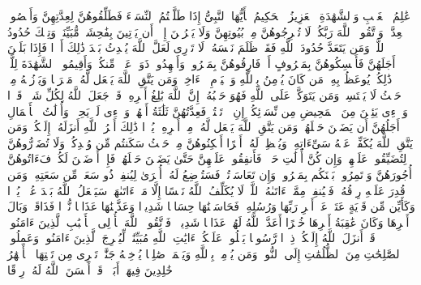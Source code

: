 \stopbuffer%
\startbuffer[\q:64:18]
عَٰلِمُ ٱلۡغَیۡبِ وَٱلشَّهَٰدَةِ ٱلۡعَزِیزُ ٱلۡحَكِیمُ%
\stopbuffer%
\startbuffer[\q:65:1]
یَٰۤأَیُّهَا ٱلنَّبِیُّ إِذَا طَلَّقۡتُمُ ٱلنِّسَاۤءَ فَطَلِّقُوهُنَّ لِعِدَّتِهِنَّ وَأَحۡصُوا۟ ٱلۡعِدَّةَۖ وَٱتَّقُوا۟ ٱللَّهَ رَبَّكُمۡۖ لَا تُخۡرِجُوهُنَّ مِنۢ بُیُوتِهِنَّ وَلَا یَخۡرُجۡنَ إِلَّاۤ أَن یَأۡتِینَ بِفَٰحِشَةࣲ مُّبَیِّنَةࣲۚ وَتِلۡكَ حُدُودُ ٱللَّهِۚ وَمَن یَتَعَدَّ حُدُودَ ٱللَّهِ فَقَدۡ ظَلَمَ نَفۡسَهُۥۚ لَا تَدۡرِی لَعَلَّ ٱللَّهَ یُحۡدِثُ بَعۡدَ ذَٰلِكَ أَمۡرࣰا%
\stopbuffer%
\startbuffer[\q:65:2]
فَإِذَا بَلَغۡنَ أَجَلَهُنَّ فَأَمۡسِكُوهُنَّ بِمَعۡرُوفٍ أَوۡ فَارِقُوهُنَّ بِمَعۡرُوفࣲ وَأَشۡهِدُوا۟ ذَوَیۡ عَدۡلࣲ مِّنكُمۡ وَأَقِیمُوا۟ ٱلشَّهَٰدَةَ لِلَّهِۚ ذَٰلِكُمۡ یُوعَظُ بِهِۦ مَن كَانَ یُؤۡمِنُ بِٱللَّهِ وَٱلۡیَوۡمِ ٱلۡءَاخِرِۚ وَمَن یَتَّقِ ٱللَّهَ یَجۡعَل لَّهُۥ مَخۡرَجࣰا%
\stopbuffer%
\startbuffer[\q:65:3]
وَیَرۡزُقۡهُ مِنۡ حَیۡثُ لَا یَحۡتَسِبُۚ وَمَن یَتَوَكَّلۡ عَلَى ٱللَّهِ فَهُوَ حَسۡبُهُۥۤۚ إِنَّ ٱللَّهَ بَٰلِغُ أَمۡرِهِۦۚ قَدۡ جَعَلَ ٱللَّهُ لِكُلِّ شَیۡءࣲ قَدۡرࣰا%
\stopbuffer%
\startbuffer[\q:65:4]
وَٱلَّٰۤءِی یَئِسۡنَ مِنَ ٱلۡمَحِیضِ مِن نِّسَاۤئِكُمۡ إِنِ ٱرۡتَبۡتُمۡ فَعِدَّتُهُنَّ ثَلَٰثَةُ أَشۡهُرࣲ وَٱلَّٰۤءِی لَمۡ یَحِضۡنَۚ وَأُو۟لَٰتُ ٱلۡأَحۡمَالِ أَجَلُهُنَّ أَن یَضَعۡنَ حَمۡلَهُنَّۚ وَمَن یَتَّقِ ٱللَّهَ یَجۡعَل لَّهُۥ مِنۡ أَمۡرِهِۦ یُسۡرࣰا%
\stopbuffer%
\startbuffer[\q:65:5]
ذَٰلِكَ أَمۡرُ ٱللَّهِ أَنزَلَهُۥۤ إِلَیۡكُمۡۚ وَمَن یَتَّقِ ٱللَّهَ یُكَفِّرۡ عَنۡهُ سَیِّءَاتِهِۦ وَیُعۡظِمۡ لَهُۥۤ أَجۡرًا%
\stopbuffer%
\startbuffer[\q:65:6]
أَسۡكِنُوهُنَّ مِنۡ حَیۡثُ سَكَنتُم مِّن وُجۡدِكُمۡ وَلَا تُضَاۤرُّوهُنَّ لِتُضَیِّقُوا۟ عَلَیۡهِنَّۚ وَإِن كُنَّ أُو۟لَٰتِ حَمۡلࣲ فَأَنفِقُوا۟ عَلَیۡهِنَّ حَتَّىٰ یَضَعۡنَ حَمۡلَهُنَّۚ فَإِنۡ أَرۡضَعۡنَ لَكُمۡ فَءَاتُوهُنَّ أُجُورَهُنَّ وَأۡتَمِرُوا۟ بَیۡنَكُم بِمَعۡرُوفࣲۖ وَإِن تَعَاسَرۡتُمۡ فَسَتُرۡضِعُ لَهُۥۤ أُخۡرَىٰ%
\stopbuffer%
\startbuffer[\q:65:7]
لِیُنفِقۡ ذُو سَعَةࣲ مِّن سَعَتِهِۦۖ وَمَن قُدِرَ عَلَیۡهِ رِزۡقُهُۥ فَلۡیُنفِقۡ مِمَّاۤ ءَاتَىٰهُ ٱللَّهُۚ لَا یُكَلِّفُ ٱللَّهُ نَفۡسًا إِلَّا مَاۤ ءَاتَىٰهَاۚ سَیَجۡعَلُ ٱللَّهُ بَعۡدَ عُسۡرࣲ یُسۡرࣰا%
\stopbuffer%
\startbuffer[\q:65:8]
وَكَأَیِّن مِّن قَرۡیَةٍ عَتَتۡ عَنۡ أَمۡرِ رَبِّهَا وَرُسُلِهِۦ فَحَاسَبۡنَٰهَا حِسَابࣰا شَدِیدࣰا وَعَذَّبۡنَٰهَا عَذَابࣰا نُّكۡرࣰا%
\stopbuffer%
\startbuffer[\q:65:9]
فَذَاقَتۡ وَبَالَ أَمۡرِهَا وَكَانَ عَٰقِبَةُ أَمۡرِهَا خُسۡرًا%
\stopbuffer%
\startbuffer[\q:65:10]
أَعَدَّ ٱللَّهُ لَهُمۡ عَذَابࣰا شَدِیدࣰاۖ فَٱتَّقُوا۟ ٱللَّهَ یَٰۤأُو۟لِی ٱلۡأَلۡبَٰبِ ٱلَّذِینَ ءَامَنُوا۟ۚ قَدۡ أَنزَلَ ٱللَّهُ إِلَیۡكُمۡ ذِكۡرࣰا%
\stopbuffer%
\startbuffer[\q:65:11]
رَّسُولࣰا یَتۡلُوا۟ عَلَیۡكُمۡ ءَایَٰتِ ٱللَّهِ مُبَیِّنَٰتࣲ لِّیُخۡرِجَ ٱلَّذِینَ ءَامَنُوا۟ وَعَمِلُوا۟ ٱلصَّٰلِحَٰتِ مِنَ ٱلظُّلُمَٰتِ إِلَى ٱلنُّورِۚ وَمَن یُؤۡمِنۢ بِٱللَّهِ وَیَعۡمَلۡ صَٰلِحࣰا یُدۡخِلۡهُ جَنَّٰتࣲ تَجۡرِی مِن تَحۡتِهَا ٱلۡأَنۡهَٰرُ خَٰلِدِینَ فِیهَاۤ أَبَدࣰاۖ قَدۡ أَحۡسَنَ ٱللَّهُ لَهُۥ رِزۡقًا%
